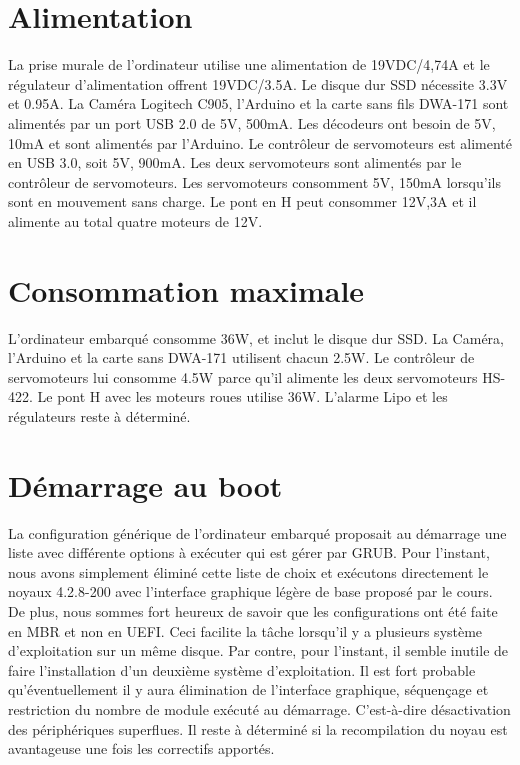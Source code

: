 \section{Alimentation}
  La prise murale de l'ordinateur utilise une alimentation de 19VDC/4,74A et le régulateur d’alimentation offrent 19VDC/3.5A. Le disque dur SSD nécessite 3.3V et 0.95A. La Caméra Logitech C905, l’Arduino et la carte sans fils DWA-171 sont alimentés par un port USB 2.0 de 5V, 500mA. Les décodeurs ont besoin de 5V, 10mA et sont alimentés par l’Arduino. Le contrôleur de servomoteurs est alimenté en USB 3.0, soit 5V, 900mA. Les deux servomoteurs sont alimentés par le contrôleur de servomoteurs. Les servomoteurs consomment 5V, 150mA lorsqu’ils sont en mouvement sans charge. Le pont en H peut consommer 12V,3A et il alimente au total quatre moteurs de 12V.

\section{Consommation maximale}

L’ordinateur embarqué consomme 36W, et inclut le disque dur SSD. La Caméra, l’Arduino et la carte sans DWA-171 utilisent chacun 2.5W. Le contrôleur de servomoteurs lui consomme 4.5W parce qu’il alimente les deux servomoteurs HS-422. Le pont H avec les moteurs roues utilise 36W. L’alarme Lipo et les régulateurs reste à déterminé. 

\section{Démarrage au boot}
La configuration générique de l’ordinateur embarqué proposait au démarrage une liste avec différente options à exécuter qui est gérer par GRUB. Pour l’instant, nous avons simplement éliminé cette liste de choix et exécutons directement le noyaux 4.2.8-200 avec l’interface graphique légère de base proposé par le cours. De plus, nous sommes fort heureux de savoir que les configurations ont été faite en MBR et non en UEFI. Ceci facilite la tâche lorsqu’il y a plusieurs système d’exploitation sur un même disque. Par contre, pour l’instant, il semble inutile de faire l’installation d’un deuxième système d’exploitation. Il est fort probable qu’éventuellement il y aura élimination de l’interface graphique, séquençage et restriction du nombre de module exécuté au démarrage. C’est-à-dire désactivation des périphériques superflues. Il reste à déterminé si la recompilation du noyau est avantageuse une fois les correctifs apportés.  
